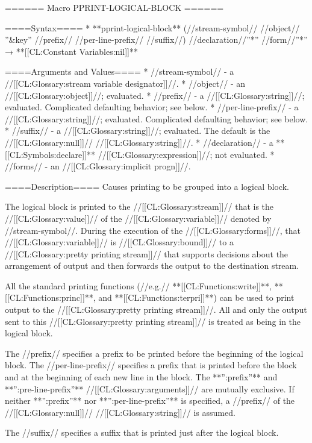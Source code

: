 ====== Macro PPRINT-LOGICAL-BLOCK ======

====Syntax====
  * **pprint-logical-block** (//stream-symbol// //object// ''&key'' //prefix// //per-line-prefix// //suffix//) //declaration//''*'' //form//''*'' → **[[CL:Constant Variables:nil]]**

====Arguments and Values====
  * //stream-symbol// - a //[[CL:Glossary:stream variable designator]]//.
  * //object// - an //[[CL:Glossary:object]]//; evaluated.
  * //prefix// - a //[[CL:Glossary:string]]//; evaluated. Complicated defaulting behavior; see below.
  * //per-line-prefix// - a //[[CL:Glossary:string]]//; evaluated. Complicated defaulting behavior; see below. 
  * //suffix// - a //[[CL:Glossary:string]]//; evaluated. The default is the //[[CL:Glossary:null]]// //[[CL:Glossary:string]]//.
  * //declaration// - a **[[CL:Symbols:declare]]** //[[CL:Glossary:expression]]//; not evaluated.
  * //forms// - an //[[CL:Glossary:implicit progn]]//.

====Description====
Causes printing to be grouped into a logical block.

The logical block is printed to the //[[CL:Glossary:stream]]// that is the //[[CL:Glossary:value]]// of the //[[CL:Glossary:variable]]// denoted by //stream-symbol//. During the execution of the //[[CL:Glossary:forms]]//, that //[[CL:Glossary:variable]]// is //[[CL:Glossary:bound]]// to a //[[CL:Glossary:pretty printing stream]]// that supports decisions about the arrangement of output and then forwards the output to the destination stream.

All the standard printing functions (//e.g.// **[[CL:Functions:write]]**, **[[CL:Functions:princ]]**, and **[[CL:Functions:terpri]]**) can be used to print output to the //[[CL:Glossary:pretty printing stream]]//. All and only the output sent to this //[[CL:Glossary:pretty printing stream]]// is treated as being in the logical block.

The //prefix// specifies a prefix to be printed before the beginning of the logical block. The //per-line-prefix// specifies a prefix that is printed before the block and at the beginning of each new line in the block. The **'':prefix''** and **'':pre-line-prefix''** //[[CL:Glossary:arguments]]// are mutually exclusive. If neither **'':prefix''** nor **'':per-line-prefix''** is specified, a //prefix// of the //[[CL:Glossary:null]]// //[[CL:Glossary:string]]// is assumed.

The //suffix// specifies a suffix that is printed just after the logical block.

